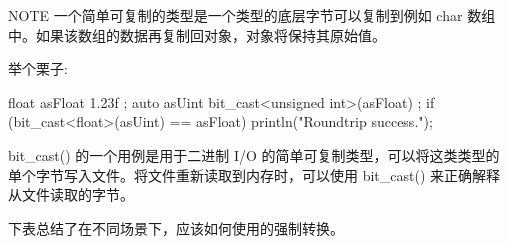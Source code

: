 \begin{myNotic}{NOTE}
一个简单可复制的类型是一个类型的底层字节可以复制到例如 char 数组中。如果该数组的数据再复制回对象，对象将保持其原始值。
\end{myNotic}

举个栗子:

\begin{cpp}
float asFloat { 1.23f };
auto asUint { bit_cast<unsigned int>(asFloat) };
if (bit_cast<float>(asUint) == asFloat) { println("Roundtrip success."); }
\end{cpp}

bit\_cast() 的一个用例是用于二进制 I/O 的简单可复制类型，可以将这类类型的单个字节写入文件。将文件重新读取到内存时，可以使用 bit\_cast() 来正确解释从文件读取的字节。


下表总结了在不同场景下，应该如何使用的强制转换。

